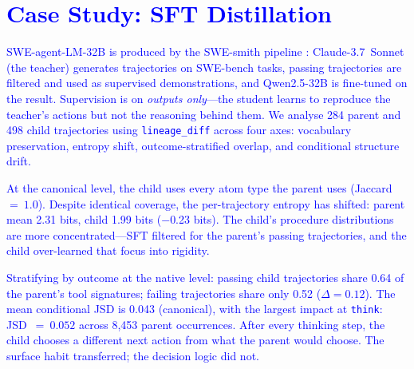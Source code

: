 \documentclass[11pt]{article}
\begin{document}
\section{\textcolor{blue}{Case Study: SFT Distillation}}
\label{sec:distillation}

\textcolor{blue}{SWE-agent-LM-32B is produced by the SWE-smith pipeline \cite{yang2025swesmith}: Claude-3.7~Sonnet (the teacher) generates trajectories on SWE-bench tasks, passing trajectories are filtered and used as supervised demonstrations, and Qwen2.5-32B is fine-tuned on the result. Supervision is on \emph{outputs only}---the student learns to reproduce the teacher's actions but not the reasoning behind them. We analyse 284 parent and 498 child trajectories using \texttt{lineage\_diff} across four axes: vocabulary preservation, entropy shift, outcome-stratified overlap, and conditional structure drift.

At the canonical level, the child uses every atom type the parent uses (Jaccard~$=~1.0$). Despite identical coverage, the per-trajectory entropy has shifted: parent mean 2.31 bits, child 1.99 bits ($-$0.23 bits). The child's procedure distributions are more concentrated---SFT filtered for the parent's passing trajectories, and the child over-learned that focus into rigidity.

Stratifying by outcome at the native level: passing child trajectories share 0.64 of the parent's tool signatures; failing trajectories share only 0.52 ($\Delta = 0.12$). The mean conditional JSD is 0.043 (canonical), with the largest impact at \texttt{think}: JSD~$=~0.052$ across 8,453 parent occurrences. After every thinking step, the child chooses a different next action from what the parent would choose. The surface habit transferred; the decision logic did not.}
\end{document}
